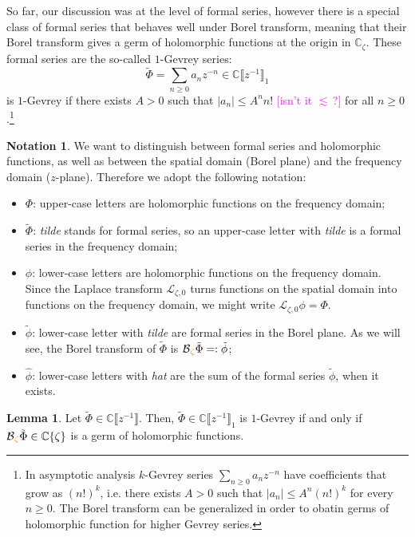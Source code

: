 \documentclass{article}
\theoremstyle{definition}
\newcommand{\C}{\mathbb{C}}
\newcommand{\laplace}{\mathcal{L}}
\newcommand{\borel}{\mathcal{B}}
\newtheorem{lemma}[definition]{Lemma}
\newtheorem*{notation*}{Notation}
\begin{document}
So far, our discussion was at the level of formal series, however there is a special class of formal series that behaves well under Borel transform, meaning that their Borel transform gives a germ of holomorphic functions at the origin in $\C_{\zeta}$. These formal series are the so-called $1$-Gevrey series:
\[\tilde{\Phi}=\sum_{n\geq 0}a_nz^{-n}\in\C \llbracket z^{-1} \rrbracket_1\]
is $1$-Gevrey if there exists $A>0$ such that $|a_n|\leq A^n n!$ \textcolor{magenta}{[isn't it $\lesssim$\,?]} for all $n\geq 0$.\footnote{In asymptotic analysis $k$-Gevrey series $\sum_{n\geq 0}a_nz^{-n}$ have coefficients that grow as $(n!)^{k}$, i.e. there exists $A>0$ such that $|a_n|\leq A^n (n!)^k$ for every $n\geq 0$. The Borel transform can be generalized in order to obatin germs of holomorphic function for higher Gevrey series. }  

\begin{notation*}
We want to distinguish between formal series and holomorphic functions, as well as between the spatial domain (Borel plane) and the frequency domain ($z$-plane). Therefore we adopt the following notation:
\begin{itemize}
\item $\Phi$: upper-case letters are holomorphic functions on the frequency domain;
\item $\tilde{\Phi}$: \textit{tilde} stands for formal series, so an upper-case letter with \textit{tilde} is a formal series in the frequency domain;
\item $\phi$: lower-case letters are holomorphic functions on the frequency domain. Since the Laplace transform $\laplace_{\zeta, 0}$ turns functions on the spatial domain into functions on the frequency domain, we might write $\laplace_{\zeta,0}\phi=\Phi$.
\item $\tilde{\phi}$: lower-case letter with \textit{tilde} are formal series in the Borel plane. As we will see, the Borel transform of $\tilde{\Phi}$ is $\borel\textcolor{orange}{_\zeta} \tilde{\Phi}=:\tilde{\phi}$; 
\item $\hat{\phi}$: lower-case letters with \textit{hat} are the sum of the formal series $\tilde{\phi}$, when it exists.  
\end{itemize}
\end{notation*}  

\begin{lemma}
Let $\tilde{\Phi}\in\C \llbracket z^{-1} \rrbracket$. Then, $\tilde{\Phi}\in\C \llbracket z^{-1} \rrbracket_1$ is $1$-Gevrey if and only if $\borel\textcolor{orange}{_\zeta}\tilde{\Phi}\in\C\lbrace\zeta\rbrace$ is a germ of holomorphic functions. 
\end{lemma}
\end{document}
